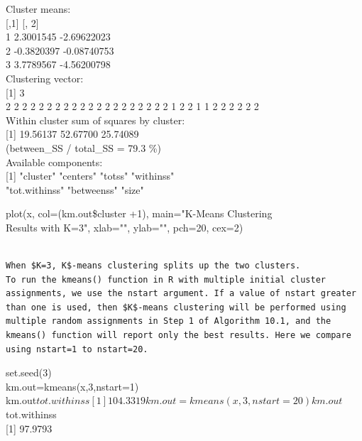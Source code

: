 \documentclass[10pt]{article}
\begin{document}
Cluster means:\\[0pt]
[,1] [, 2]\\
1 2.3001545 -2.69622023\\
2 -0.3820397 -0.08740753\\
3 3.7789567 -4.56200798\\
Clustering vector:\\[0pt]
[1] 3\\
2 2 2 2 2 2 2 2 2 2 2 2 2 2 2 2 2 2 2 2 1 2 2 1 1 2 2 2 2 2 2\\
Within cluster sum of squares by cluster:\\[0pt]
[1] 19.56137 52.67700 25.74089\\
(between\_SS / total\_SS = 79.3 \%)\\
Available components:\\[0pt]
[1] "cluster" "centers" "totss" "withinss"\\
"tot.withinss" "betweenss" "size"

\begin{displayquote}
plot(x, col=(km.out\$cluster +1), main="K-Means Clustering\\
Results with K=3", xlab="", ylab="", pch=20, cex=2)
\end{displayquote}

\begin{verbatim}

When $K=3, K$-means clustering splits up the two clusters.
To run the kmeans() function in R with multiple initial cluster assignments, we use the nstart argument. If a value of nstart greater than one is used, then $K$-means clustering will be performed using multiple random assignments in Step 1 of Algorithm 10.1, and the kmeans() function will report only the best results. Here we compare using nstart=1 to nstart=20.
\end{verbatim}

\begin{displayquote}
set.seed(3)\\
km.out=kmeans(x,3,nstart=1)\\
km.out$tot.withinss
[1] 104.3319
km.out=kmeans(x,3,nstart = 20)
km.out$tot.withinss\\[0pt]
[1] 97.9793
\end{displayquote}
\end{document}
